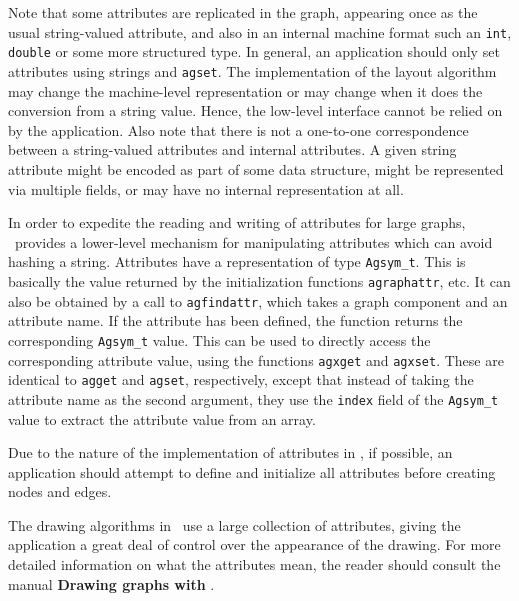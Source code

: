 Note that some attributes are replicated in the graph, appearing once
as the usual string-valued attribute, and also in an internal machine
format such an {\tt int}, {\tt double} or some more structured type.
In general, an application should only set attributes
using strings and {\tt agset}. The implementation of the layout algorithm
may change the machine-level representation or may change when it does
the conversion from a string value. Hence, the low-level
interface cannot be relied on by the application. Also note that there
is not a one-to-one correspondence between a string-valued
attributes and internal attributes. A given string attribute might be
encoded as part of some data structure, might be represented via 
multiple fields, or may have no internal representation at all. 

In order to expedite the reading and writing of attributes for large
graphs, \gviz\ provides a lower-level mechanism for manipulating attributes
which can avoid hashing a string.
Attributes have a representation of type \verb+Agsym_t+. This is basically the
value returned by the initialization functions {\tt agraphattr}, etc.
It can also be obtained by a call to {\tt agfindattr}, which takes
a graph component and an attribute name. If the attribute has been defined,
the function returns the corresponding \verb+Agsym_t+ value. 
This can be used to directly access the corresponding attribute value,
using the functions {\tt agxget} and {\tt agxset}. These are identical to 
{\tt agget} and {\tt agset}, respectively, except that instead of
taking the attribute name as the second argument, they use 
the {\tt index} field of the \verb+Agsym_t+ value to extract the attribute
value from an array.

Due to the nature of the implementation of attributes in \gviz, if
possible, an application should attempt to define and initialize all
attributes before creating nodes and edges.

The drawing algorithms in \gviz\ use a large collection of attributes,
giving the application a great deal of control over the appearance of the
drawing. For more detailed information on what the attributes mean, the
reader should consult the manual {\bf Drawing graphs with \dot}.

